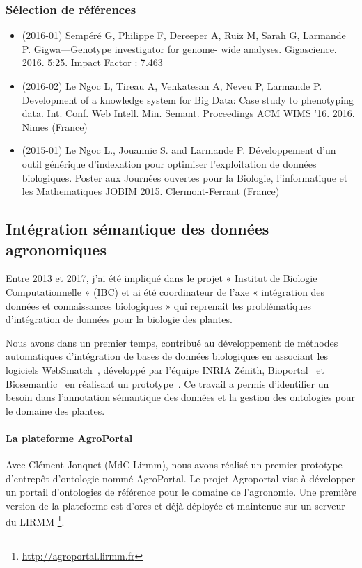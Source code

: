 \subsubsection*{Sélection de références}

\begin{itemize}
\item (2016-01) Sempéré G, Philippe F, Dereeper A, Ruiz M, Sarah G, Larmande P. Gigwa—Genotype investigator for genome- wide analyses. Gigascience. 2016. 5:25. Impact Factor : 7.463
\item (2016-02) Le Ngoc L, Tireau A, Venkatesan A, Neveu P, Larmande P. Development of a knowledge system for Big Data: Case study to phenotyping data. Int. Conf. Web Intell. Min. Semant. Proceedings ACM WIMS ’16. 2016. Nimes (France)
\item (2015-01) Le Ngoc L., Jouannic S. and Larmande P. Développement d'un outil générique d'indexation pour optimiser l'exploitation de données biologiques. Poster aux Journées ouvertes pour la Biologie, l’informatique et les Mathematiques JOBIM 2015. Clermont-Ferrant (France)
\end{itemize}


\subsection*{Intégration sémantique des données agronomiques}
\label{IBC}

Entre 2013 et 2017, j'ai été impliqué dans le projet « Institut de Biologie Computationnelle » (IBC) et ai été coordinateur de l’axe « intégration des données et connaissances biologiques » qui reprenait les problématiques d’intégration de données pour la biologie des plantes.

Nous avons dans un premier temps, contribué au développement de méthodes automatiques d’intégration de bases de données biologiques en associant les logiciels WebSmatch~\cite{Coletta2012}, développé par l’équipe INRIA Zénith, Bioportal~\cite{Noy2009,Melzi} et Biosemantic~\cite{wollbrett2013clever} en réalisant un prototype~\cite{castanier2014semantic}. Ce travail a permis d’identifier un besoin dans l’annotation sémantique des données et la gestion des ontologies pour le domaine des plantes. \\

\paragraph*{La plateforme AgroPortal} Avec Clément Jonquet (MdC Lirmm), nous avons réalisé un premier prototype d’entrepôt d’ontologie nommé AgroPortal. Le projet Agroportal vise à développer un portail d'ontologies de référence pour le domaine de l'agronomie. Une première version de la plateforme est d’ores et déjà déployée et maintenue sur un serveur du LIRMM \footnote{\url{http://agroportal.lirmm.fr}}. 

